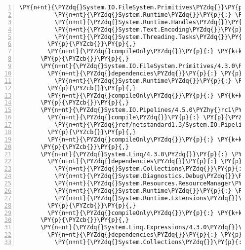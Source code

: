 \begin{Verbatim}[commandchars=\\\{\},numbers=left,firstnumber=1,stepnumber=1,numberblanklines=0]
          \PY{n+nt}{\PYZdq{}System.IO.FileSystem.Primitives\PYZdq{}}\PY{p}{:} \PY{l+s+s2}{\PYZdq{}4.3.0\PYZdq{}}\PY{p}{,}
          \PY{n+nt}{\PYZdq{}System.Runtime\PYZdq{}}\PY{p}{:} \PY{l+s+s2}{\PYZdq{}4.3.0\PYZdq{}}\PY{p}{,}
          \PY{n+nt}{\PYZdq{}System.Runtime.Handles\PYZdq{}}\PY{p}{:} \PY{l+s+s2}{\PYZdq{}4.3.0\PYZdq{}}\PY{p}{,}
          \PY{n+nt}{\PYZdq{}System.Text.Encoding\PYZdq{}}\PY{p}{:} \PY{l+s+s2}{\PYZdq{}4.3.0\PYZdq{}}\PY{p}{,}
          \PY{n+nt}{\PYZdq{}System.Threading.Tasks\PYZdq{}}\PY{p}{:} \PY{l+s+s2}{\PYZdq{}4.3.0\PYZdq{}}
        \PY{p}{\PYZcb{}}\PY{p}{,}
        \PY{n+nt}{\PYZdq{}compileOnly\PYZdq{}}\PY{p}{:} \PY{k+kc}{true}
      \PY{p}{\PYZcb{}}\PY{p}{,}
      \PY{n+nt}{\PYZdq{}System.IO.FileSystem.Primitives/4.3.0\PYZdq{}}\PY{p}{:} \PY{p}{\PYZob{}}
        \PY{n+nt}{\PYZdq{}dependencies\PYZdq{}}\PY{p}{:} \PY{p}{\PYZob{}}
          \PY{n+nt}{\PYZdq{}System.Runtime\PYZdq{}}\PY{p}{:} \PY{l+s+s2}{\PYZdq{}4.3.0\PYZdq{}}
        \PY{p}{\PYZcb{}}\PY{p}{,}
        \PY{n+nt}{\PYZdq{}compileOnly\PYZdq{}}\PY{p}{:} \PY{k+kc}{true}
      \PY{p}{\PYZcb{}}\PY{p}{,}
      \PY{n+nt}{\PYZdq{}System.IO.Pipelines/4.5.0\PYZhy{}rc1\PYZdq{}}\PY{p}{:} \PY{p}{\PYZob{}}
        \PY{n+nt}{\PYZdq{}compile\PYZdq{}}\PY{p}{:} \PY{p}{\PYZob{}}
          \PY{n+nt}{\PYZdq{}ref/netstandard1.3/System.IO.Pipelines.dll\PYZdq{}}\PY{p}{:} \PY{p}{\PYZob{}}\PY{p}{\PYZcb{}}
        \PY{p}{\PYZcb{}}\PY{p}{,}
        \PY{n+nt}{\PYZdq{}compileOnly\PYZdq{}}\PY{p}{:} \PY{k+kc}{true}
      \PY{p}{\PYZcb{}}\PY{p}{,}
      \PY{n+nt}{\PYZdq{}System.Linq/4.3.0\PYZdq{}}\PY{p}{:} \PY{p}{\PYZob{}}
        \PY{n+nt}{\PYZdq{}dependencies\PYZdq{}}\PY{p}{:} \PY{p}{\PYZob{}}
          \PY{n+nt}{\PYZdq{}System.Collections\PYZdq{}}\PY{p}{:} \PY{l+s+s2}{\PYZdq{}4.3.0\PYZdq{}}\PY{p}{,}
          \PY{n+nt}{\PYZdq{}System.Diagnostics.Debug\PYZdq{}}\PY{p}{:} \PY{l+s+s2}{\PYZdq{}4.3.0\PYZdq{}}\PY{p}{,}
          \PY{n+nt}{\PYZdq{}System.Resources.ResourceManager\PYZdq{}}\PY{p}{:} \PY{l+s+s2}{\PYZdq{}4.3.0\PYZdq{}}\PY{p}{,}
          \PY{n+nt}{\PYZdq{}System.Runtime\PYZdq{}}\PY{p}{:} \PY{l+s+s2}{\PYZdq{}4.3.0\PYZdq{}}\PY{p}{,}
          \PY{n+nt}{\PYZdq{}System.Runtime.Extensions\PYZdq{}}\PY{p}{:} \PY{l+s+s2}{\PYZdq{}4.3.0\PYZdq{}}
        \PY{p}{\PYZcb{}}\PY{p}{,}
        \PY{n+nt}{\PYZdq{}compileOnly\PYZdq{}}\PY{p}{:} \PY{k+kc}{true}
      \PY{p}{\PYZcb{}}\PY{p}{,}
      \PY{n+nt}{\PYZdq{}System.Linq.Expressions/4.3.0\PYZdq{}}\PY{p}{:} \PY{p}{\PYZob{}}
        \PY{n+nt}{\PYZdq{}dependencies\PYZdq{}}\PY{p}{:} \PY{p}{\PYZob{}}
          \PY{n+nt}{\PYZdq{}System.Collections\PYZdq{}}\PY{p}{:} \PY{l+s+s2}{\PYZdq{}4.3.0\PYZdq{}}\PY{p}{,}

\end{Verbatim}
